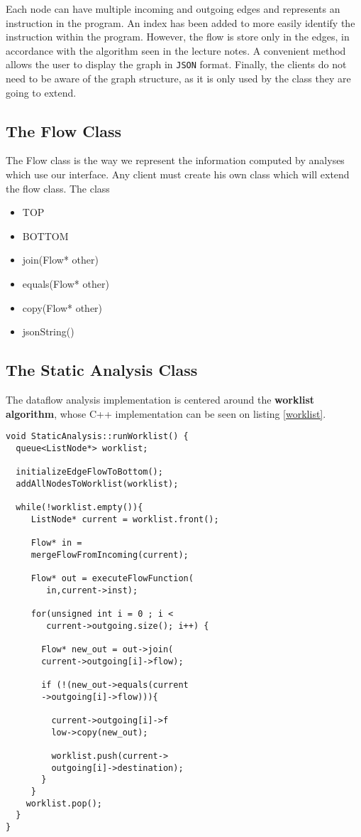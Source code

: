 \documentclass[11pt,twocolumn]{article}
\newcommand{\tbf}{\textbf}
\newcommand{\code}{\lstinline}
\begin{document}
Each node can have multiple incoming and outgoing edges and represents an instruction in the program. An index has been added to more easily identify the instruction within the program. However, the flow is store only in the edges, in accordance with the algorithm seen in the lecture notes. A convenient method allows the user to display the graph in \code{JSON} format. Finally, the clients do not need to be aware of the graph structure, as it is only used by the class they are going to extend.

\subsection{The Flow Class}

The Flow class is the way we represent the information computed by analyses which use our interface. Any client must create his own class which will extend the flow class. The class 

\begin{itemize}
\item TOP
\item BOTTOM
\item join(Flow* other)
\item equals(Flow* other)
\item copy(Flow* other)
\item jsonString()
\end{itemize}


\subsection{The Static Analysis Class}

The dataflow analysis implementation is centered around the \tbf{worklist algorithm}, whose C++ implementation can be seen on listing \ref{worklist}.

\begin{lstlisting}[caption=Worklist Algorithm, label=worklist]
void StaticAnalysis::runWorklist() {
  queue<ListNode*> worklist;
  
  initializeEdgeFlowToBottom();
  addAllNodesToWorklist(worklist);
  
  while(!worklist.empty()){
     ListNode* current = worklist.front();
     
     Flow* in = 
     mergeFlowFromIncoming(current);
     
     Flow* out = executeFlowFunction(
     	in,current->inst);
     
     for(unsigned int i = 0 ; i < 
     	current->outgoing.size(); i++) {
       
       Flow* new_out = out->join(
       current->outgoing[i]->flow);
     
       if (!(new_out->equals(current
       ->outgoing[i]->flow))){
     
         current->outgoing[i]->f
         low->copy(new_out);
     
         worklist.push(current->
         outgoing[i]->destination);
       }
     }
    worklist.pop();
  }
}
\end{lstlisting}
\end{document}
